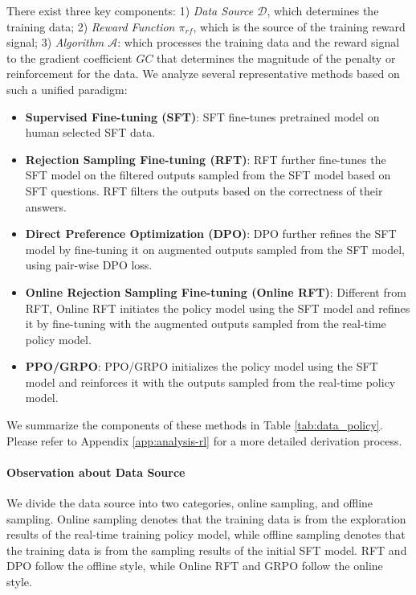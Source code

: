 There exist three key components: 1) \textit{Data Source $\mathcal{D}$}, which determines the training data; 2) \textit{Reward Function $\pi_{{rf}}$}, which is the source of the training reward signal; 3) \textit{Algorithm $\mathcal{A}$}: which processes the training data and the reward signal to the gradient coefficient $GC$ that determines the magnitude of the penalty or reinforcement for the data. We analyze several representative methods based on such a unified paradigm:

\begin{itemize}
    \item  \textbf{Supervised Fine-tuning (SFT)}: SFT fine-tunes pretrained model on human selected SFT data.
    \item \textbf{Rejection Sampling Fine-tuning (RFT)}: RFT further fine-tunes the SFT model on the filtered outputs sampled from the SFT model based on SFT questions. RFT filters the outputs based on the correctness of their answers.
    \item \textbf{Direct Preference Optimization (DPO)}: DPO further refines the SFT model by fine-tuning it on augmented outputs sampled from the SFT model, using pair-wise DPO loss.
    \item \textbf{Online Rejection Sampling Fine-tuning (Online RFT)}: Different from RFT, Online RFT initiates the policy model using the SFT model and refines it by fine-tuning with the augmented outputs sampled from the real-time policy model.
    \item \textbf{PPO/GRPO}: PPO/GRPO initializes the policy model using the SFT model and reinforces it with the outputs sampled from the real-time policy model.
\end{itemize}

We summarize the components of these methods in Table \ref{tab:data_policy}.
Please refer to Appendix \ref{app:analysis-rl} for a more detailed derivation process.

\paragraph{Observation about Data Source} We divide the data source into two categories, online sampling, and offline sampling. Online sampling denotes that the training data is from the exploration results of the real-time training policy model, while offline sampling denotes that the training data is from the sampling results of the initial SFT model. RFT and DPO follow the offline style, while Online RFT and GRPO follow the online style. 

